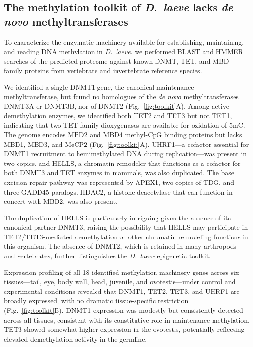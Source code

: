 \documentclass[12pt]{article}
\begin{document}

\subsection*{The methylation toolkit of \textit{D.\ laeve} lacks \textit{de novo} methyltransferases}

To characterize the enzymatic machinery available for establishing, maintaining, and reading DNA methylation in \textit{D.\ laeve}, we performed BLAST and HMMER searches of the predicted proteome against known DNMT, TET, and MBD-family proteins from vertebrate and invertebrate reference species.

We identified a single DNMT1 gene, the canonical maintenance methyltransferase, but found no homologues of the \textit{de novo} methyltransferases DNMT3A or DNMT3B, nor of DNMT2 (Fig.~\ref{fig:toolkit}A). Among active demethylation enzymes, we identified both TET2 and TET3 but not TET1, indicating that two TET-family dioxygenases are available for oxidation of 5mC. The genome encodes MBD2 and MBD4 methyl-CpG binding proteins but lacks MBD1, MBD3, and MeCP2 (Fig.~\ref{fig:toolkit}A). UHRF1---a cofactor essential for DNMT1 recruitment to hemimethylated DNA during replication---was present in two copies, and HELLS, a chromatin remodeler that functions as a cofactor for both DNMT3 and TET enzymes in mammals, was also duplicated. The base excision repair pathway was represented by APEX1, two copies of TDG, and three GADD45 paralogs. HDAC2, a histone deacetylase that can function in concert with MBD2, was also present.

The duplication of HELLS is particularly intriguing given the absence of its canonical partner DNMT3, raising the possibility that HELLS may participate in TET2/TET3-mediated demethylation or other chromatin remodeling functions in this organism. The absence of DNMT2, which is retained in many arthropods and vertebrates, further distinguishes the \textit{D.\ laeve} epigenetic toolkit.

Expression profiling of all 18 identified methylation machinery genes across six tissues---tail, eye, body wall, head, juvenile, and ovotestis---under control and experimental conditions revealed that DNMT1, TET2, TET3, and UHRF1 are broadly expressed, with no dramatic tissue-specific restriction (Fig.~\ref{fig:toolkit}B). DNMT1 expression was modestly but consistently detected across all tissues, consistent with its constitutive role in maintenance methylation. TET3 showed somewhat higher expression in the ovotestis, potentially reflecting elevated demethylation activity in the germline.
\end{document}
